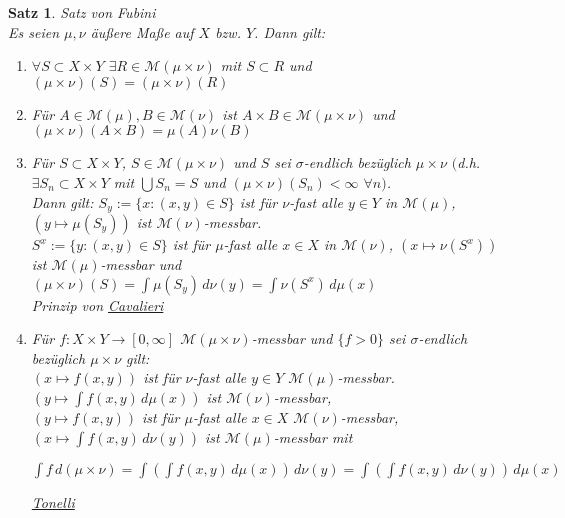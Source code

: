 \documentclass[11pt]{memoir}
\theoremstyle{changebreak}
\newtheorem{Satz}{Satz}[chapter]
\begin{document}
\begin{Satz}
\emph{Satz von Fubini} \\
Es seien $\mu, \nu$ äußere Maße auf $X$ bzw. $Y$. Dann gilt:
\begin{enumerate}
	\item $\forall S \subset X \times Y$ $\exists R \in \mathscr M(\mu \times \nu)$ mit $S \subset R$ und $(\mu \times \nu)(S) = (\mu \times \nu)(R)$

	\item Für $A \in \mathscr M(\mu), B \in \mathscr M(\nu)$ ist $A \times B \in \mathscr M(\mu \times \nu)$ und $(\mu \times \nu)(A \times B) = \mu(A)\nu(B)$

	\item Für $S \subset X \times Y$, $S \in \mathscr M(\mu \times \nu)$ und $S$ sei $\sigma$-endlich bezüglich $\mu \times \nu$ $($d.h. $\exists S_n \subset X \times Y$ mit $\bigcup S_n = S$ und $(\mu \times \nu)(S_n) < \infty$ $\forall n)$. \\
	Dann gilt: $S_y := \{x: (x, y) \in S\}$ ist für $\nu$-fast alle $y \in Y$ in $\mathscr M(\mu)$, $(y \mapsto \mu(S_y))$ ist $\mathscr M(\nu)$-messbar. \\
	$S^x := \{y : (x, y) \in S\}$ ist für $\mu$-fast alle $x \in X$ in $\mathscr M(\nu)$, $(x \mapsto \nu(S^x))$ ist $\mathscr M(\mu)$-messbar und $(\mu \times \nu)(S) = \int \mu(S_y)\, d\nu(y) = \int \nu(S^x) \, d\mu(x)$ \\
	\emph{Prinzip von \underline{Cavalieri}}

	\item Für $f: X \times Y \rightarrow [0, \infty]$ $\mathscr M(\mu \times \nu)$-messbar und $\{f > 0\}$ sei $\sigma$-endlich bezüglich $\mu \times \nu$ gilt: \\
	$(x \mapsto f(x, y))$ ist für $\nu$-fast alle $y \in Y$ $\mathscr M(\mu)$-messbar. \\
	$\left(y \mapsto \int f(x, y) \, d\mu(x)\right) $ ist $\mathscr M(\nu)$-messbar, \\
	$(y \mapsto f(x, y))$ ist für $\mu$-fast alle $x \in X$ $\mathscr M(\nu)$-messbar, \\
	$\left( x \mapsto \int f(x, y) \, d\nu(y)\right)$ ist $\mathscr M(\mu)$-messbar mit
	\begin{center}
		$\int f \, d(\mu \times \nu) = \int \left( \int f(x, y) \, d\mu(x) \right) \, d\nu(y) = \int \left( \int f(x, y) \, d\nu(y) \right) \, d\mu(x)$ \\
	\end{center}
	\emph{\underline{Tonelli}}


\end{enumerate}
\end{Satz}
\end{document}
